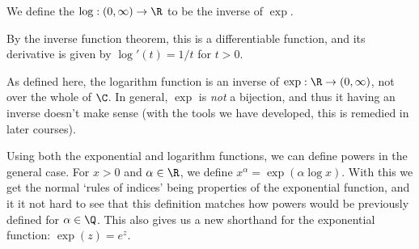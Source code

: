 \begin{definition}
	We define the  $\log : (0, \infty) \rightarrow \R$ to be the inverse of $\exp$.
\end{definition}

By the inverse function theorem, this is a differentiable function, and its derivative is given by $\log'(t) = 1/t$ for $t > 0$.

\begin{remark}As defined here, the logarithm function is an inverse of $\exp: \R \rightarrow (0, \infty)$, not over the whole of $\C$. In general, $\exp$ is \emph{not} a bijection, and thus it having an inverse doesn't make sense (with the tools we have developed, this is remedied in later courses).
\end{remark}

Using both the exponential and logarithm functions, we can define powers in the general case. For $x > 0$ and $\alpha \in \R$, we define $x^\alpha = \exp(\alpha \log x)$. With this we get the normal `rules of indices' being properties of the exponential function, and it it not hard to see that this definition matches how powers would be previously defined for $\alpha \in \Q$. This also gives us a new shorthand for the exponential function: $\exp(z) = e^z$.

